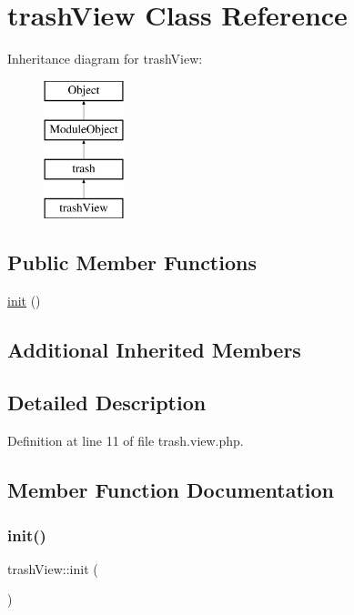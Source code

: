\hypertarget{classtrashView}{}\section{trash\+View Class Reference}
\label{classtrashView}
Inheritance diagram for trash\+View\+:\begin{figure}[H]
\begin{center}
\leavevmode
\includegraphics[height=4.000000cm]{classtrashView}
\end{center}
\end{figure}
\subsection*{Public Member Functions}
\begin{DoxyCompactItemize}
\item 
\hyperlink{classtrashView_adc7e3f13f2c3914a326bc73c572cceac}{init} ()
\end{DoxyCompactItemize}
\subsection*{Additional Inherited Members}


\subsection{Detailed Description}


Definition at line 11 of file trash.\+view.\+php.



\subsection{Member Function Documentation}
\hypertarget{classtrashView_adc7e3f13f2c3914a326bc73c572cceac}{}\label{classtrashView_adc7e3f13f2c3914a326bc73c572cceac} 
\subsubsection{\texorpdfstring{init()}{init()}}
{\footnotesize\ttfamily trash\+View\+::init (\begin{DoxyParamCaption}{ }\end{DoxyParamCaption})}

